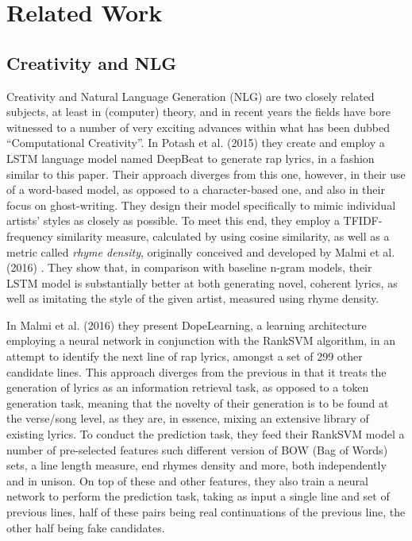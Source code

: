 \label{chap:relatedwork}
\section{Related Work}

\subsection{Creativity and NLG}
\label{sec:creativity+nlg}
Creativity and Natural Language Generation (NLG) are two closely related subjects, at least in (computer) theory, and in recent years the fields have bore witnessed to a number of very exciting advances within what has been dubbed “Computational Creativity”.
In Potash et al. (2015) \cite{potash-etal-2015-ghostwriter} they create and employ a LSTM language model named DeepBeat to generate rap lyrics, in a fashion similar to this paper. Their approach diverges from this one, however, in their use of a word-based model, as opposed to a character-based one, and also in their focus on ghost-writing. They design their model specifically to mimic individual artists’ styles as closely as possible. To meet this end, they employ a TFIDF-frequency similarity measure, calculated by using cosine similarity, as well as a metric called \textit{rhyme density}, originally conceived and developed by Malmi et al. (2016) \cite{Malmi_2016}. They show that, in comparison with baseline n-gram models, their LSTM model is substantially better at both generating novel, coherent lyrics, as well as imitating the style of the given artist, measured using rhyme density.

In Malmi et al. (2016) \cite{Malmi_2016} they present DopeLearning, a learning architecture employing a neural network in conjunction with the RankSVM algorithm, in an attempt to identify the next line of rap lyrics, amongst a set of 299 other candidate lines. This approach diverges from the previous in that it treats the generation of lyrics as an information retrieval task, as opposed to a token generation task, meaning that the novelty of their generation is to be found at the verse/song level, as they are, in essence, mixing an extensive library of existing lyrics. To conduct the prediction task, they feed their RankSVM model a number of pre-selected features such different version of BOW (Bag of Words) sets, a line length measure, end rhymes density and more, both independently and in unison. On top of these and other features, they also train a neural network to perform the prediction task, taking as input a single line and set of previous lines, half of these pairs being real continuations of the previous line, the other half being fake candidates.

